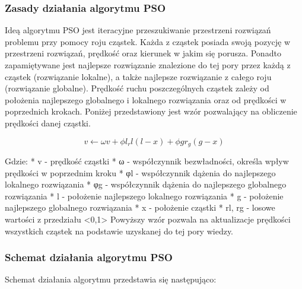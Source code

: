 \documentclass[11pt]{article}
\begin{document}
\hypertarget{zasady-dziaux142ania-algorytmu-pso}{%
\subsubsection{Zasady działania algorytmu
PSO}\label{zasady-dziaux142ania-algorytmu-pso}}

Ideą algorytmu PSO jest iteracyjne przeszukiwanie przestrzeni rozwiązań
problemu przy pomocy roju cząstek. Każda z cząstek posiada swoją pozycję
w przestrzeni rozwiązań, prędkość oraz kierunek w jakim się porusza.
Ponadto zapamiętywane jest najlepsze rozwiązanie znalezione do tej pory
przez każdą z cząstek (rozwiązanie lokalne), a także najlepsze
rozwiązanie z całego roju (rozwiązanie globalne). Prędkość ruchu
poszczególnych cząstek zależy od położenia najlepszego globalnego i
lokalnego rozwiązania oraz od prędkości w poprzednich krokach. Poniżej
przedstawiony jest wzór pozwalający na obliczenie prędkości danej
cząstki.

\[
v \leftarrow \omega v + \phi l_rl(l-x) + \phi gr_g(g-x)
\]

Gdzie: * v - prędkość cząstki * ω - współczynnik bezwładności, określa
wpływ prędkości w poprzednim kroku * φl - współczynnik dążenia do
najlepszego lokalnego rozwiązania * φg - współczynnik dążenia do
najlepszego globalnego rozwiązania * l - położenie najlepszego lokalnego
rozwiązania * g - położenie najlepszego globalnego rozwiązania * x -
położenie cząstki * rl, rg - losowe wartości z przedziału
\textless0,1\textgreater{} Powyższy wzór pozwala na aktualizacje
prędkości wszystkich cząstek na podstawie uzyskanej do tej pory wiedzy.

\hypertarget{schemat-dziaux142ania-algorytmu-pso}{%
\subsubsection{Schemat działania algorytmu
PSO}\label{schemat-dziaux142ania-algorytmu-pso}}

Schemat działania algorytmu przedstawia się następująco:
\end{document}
